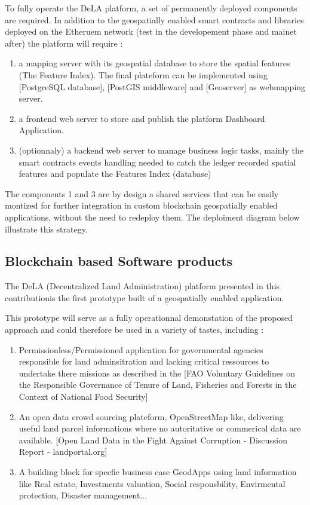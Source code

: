 \documentclass{isprs} %
\begin{document}
To fully operate the DeLA platform, a set of permanently deployed components are required. In addition to the geospatially enabled smart contracts and libraries deployed on the Etheruem network (test in the developement phase and mainet after) the platform will require : 
\begin{enumerate}
\setlength\itemsep{0em}\setlength\parskip{0em}\setlength\topsep{0em}\setlength\partopsep{0em}\setlength\parsep{0em} 
\item{a mapping server with its geospatial database to store the spatial features (The Feature Index). The final plateform can be implemented using [PostgreSQL database], [PostGIS middleware] and [Geoserver] as webmapping server.} 
\item{a frontend web server to store and publish the platform Dashboard Application.}
\item{(optionnaly) a backend web server to manage business logic tasks, mainly the smart contracts events handling needed to catch the ledger recorded spatial features and populate the Features Index (database)}
\end{enumerate}

The components 1 and 3 are by design a shared services that can be easily montized for further integration in custom blockchain geospatially enabled applications, without the need to redeploy them. The deploiment diagram below illustrate this strategy.

\subsection{Blockchain based Software products}\label{sec:Blockchain based Software products}

The DeLA (Decentralized Land Administration) platform presented in this contributionis the first prototype built of a geospatially enabled application.

This prototype will serve as a fully operationnal demonstation of the proposed approach and could therefore be used in a variety of tastes, including :
\begin{enumerate}
\setlength\itemsep{0em}\setlength\parskip{0em}\setlength\topsep{0em}\setlength\partopsep{0em}\setlength\parsep{0em} 
\item{Permissionless/Permissioned application for governmental agencies responsible for land adminsitration and lacking critical ressources to undertake there missions as described in the [FAO Voluntary Guidelines on the Responsible Governance of Tenure of Land, Fisheries and Forests in the Context of National Food Security]}
\item{An open data crowd sourcing plateform, OpenStreetMap like, delivering useful land parcel informations where no autoritative or commerical data are available. [Open Land Data in the Fight Against Corruption - Discussion Report - landportal.org]}
\item{A building block for specfic business case GeodApps using land information like Real estate, Investments valuation, Social responsbility, Envirmental protection, Disaster management...}
\end{enumerate}
\end{document}

